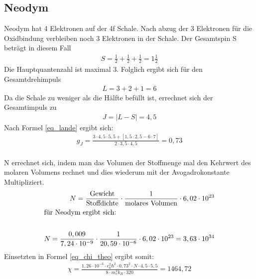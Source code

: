 \subsection{Neodym }
Neodym hat 4 Elektronen auf der 4f Schale. Nach abzug der 3 Elektronen für die Oxidbindung verbleiben noch 3 Elektronen in der Schale. Der Gesamtspin S beträgt in diesem Fall 
\begin{align*}
S=\frac{1}{2}+ \frac{1}{2}+ \frac{1}{2} = 1 \frac{1}{2}
\end{align*}
Die Hauptquantenzahl ist maximal 3. Folglich ergibt sich für den Gesamtdrehimpuls \begin{align*}
L=3+2+1=6
\end{align*}
Da die Schale zu weniger als die Hälfte befüllt ist, errechnet sich der Gesamtimpuls zu 
\begin{align*}
J=|L-S|=4,5
\end{align*}
Nach Formel \eqref{eq_lande} ergibt sich:
\begin{align}
g_J=\frac{3\cdot4,5\cdot5,5+[1,5\cdot2,5-6\cdot7]}{2\cdot 3,5\cdot4,5}=0,73
\end{align}\\
N errechnet sich, indem man das Volumen der Stoffmenge mal den Kehrwert des molaren Volumens rechnet und dies wiederum mit der Avogadrokonstante Multipliziert.
\begin{align}
N=\frac{\text{Gewicht}}{\text{Stoffdichte}}\cdot\frac{1}{\text{molares Volumen}}\cdot6,02\cdot10^{23}
\label{eq_N}\\
\intertext{für Neodym ergibt sich:}\\
N=\frac{0,009}{7,24\cdot10^{-9}}\cdot\frac{1}{20,59\cdot10^{-6}}\cdot6,02\cdot10^{23}= 3,63\cdot10^{34}
\end{align}
Einsetzten in Formel \eqref{eq_chi_theo} ergibt somit:
\begin{align}
\chi= \frac{1,26\cdot 10^{-6}\cdot e_0^2\hbar^2 \cdot 0,73^2 \cdot N\cdot 4,5\cdot 5,5}{8\cdot m_e^2 k_B \cdot320}=1464,72
\end{align}

